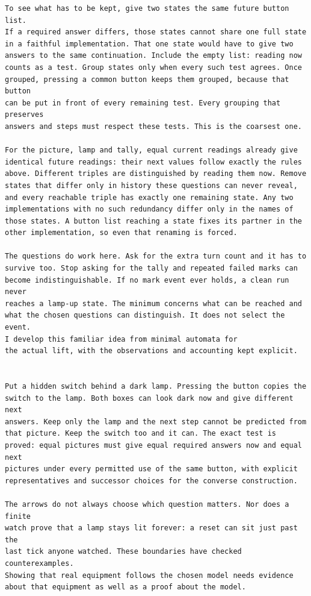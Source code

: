 \documentclass[11pt,twoside]{article}
\theoremstyle{thielethm}
\theoremstyle{thieledef}
\theoremstyle{thieledef}
\theoremstyle{thieledef}
\theoremstyle{thielethm}
\theoremstyle{thieleobs}
\theoremstyle{thielethm}
\begin{document}
\begin{small}
\begin{verbatim}
To see what has to be kept, give two states the same future button list.
If a required answer differs, those states cannot share one full state
in a faithful implementation. That one state would have to give two
answers to the same continuation. Include the empty list: reading now
counts as a test. Group states only when every such test agrees. Once
grouped, pressing a common button keeps them grouped, because that button
can be put in front of every remaining test. Every grouping that preserves
answers and steps must respect these tests. This is the coarsest one.

For the picture, lamp and tally, equal current readings already give
identical future readings: their next values follow exactly the rules
above. Different triples are distinguished by reading them now. Remove
states that differ only in history these questions can never reveal,
and every reachable triple has exactly one remaining state. Any two
implementations with no such redundancy differ only in the names of
those states. A button list reaching a state fixes its partner in the
other implementation, so even that renaming is forced.

The questions do work here. Ask for the extra turn count and it has to
survive too. Stop asking for the tally and repeated failed marks can
become indistinguishable. If no mark event ever holds, a clean run never
reaches a lamp-up state. The minimum concerns what can be reached and
what the chosen questions can distinguish. It does not select the event.
I develop this familiar idea from minimal automata for
the actual lift, with the observations and accounting kept explicit.


Put a hidden switch behind a dark lamp. Pressing the button copies the
switch to the lamp. Both boxes can look dark now and give different next
answers. Keep only the lamp and the next step cannot be predicted from
that picture. Keep the switch too and it can. The exact test is proved: equal pictures must give equal required answers now and equal next
pictures under every permitted use of the same button, with explicit
representatives and successor choices for the converse construction.

The arrows do not always choose which question matters. Nor does a finite
watch prove that a lamp stays lit forever: a reset can sit just past the
last tick anyone watched. These boundaries have checked counterexamples.
Showing that real equipment follows the chosen model needs evidence
about that equipment as well as a proof about the model.




\end{verbatim}
\end{small}
\end{document}
